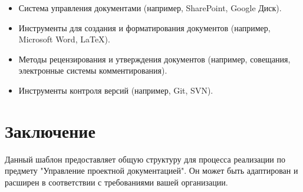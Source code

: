 \documentclass{article}
\begin{document}
\begin{itemize}
    \item Система управления документами (например, SharePoint, Google Диск).
    \item Инструменты для создания и форматирования документов (например, Microsoft Word, LaTeX).
    \item Методы рецензирования и утверждения документов (например, совещания, электронные системы комментирования).
    \item Инструменты контроля версий (например, Git, SVN).
\end{itemize}

\section{Заключение}
Данный шаблон предоставляет общую структуру для процесса реализации по предмету "Управление проектной документацией". Он может быть адаптирован и расширен в соответствии с требованиями вашей организации.
\end{document}
